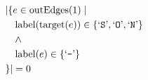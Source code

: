 \begin{align*}
&|\{e \in \mathrm{outEdges}(1)  \mid \\
&\quad \mathrm{label}(\mathrm{target}(e)) \in \{ \text{`\texttt{S}'},  \text{`\texttt{O}'},  \text{`\texttt{N}'} \}\\
&\quad \wedge\\
&\quad \mathrm{label}(e) \in \{ \text{`\texttt{-}'} \}\\
&\}| = 0
\end{align*}

